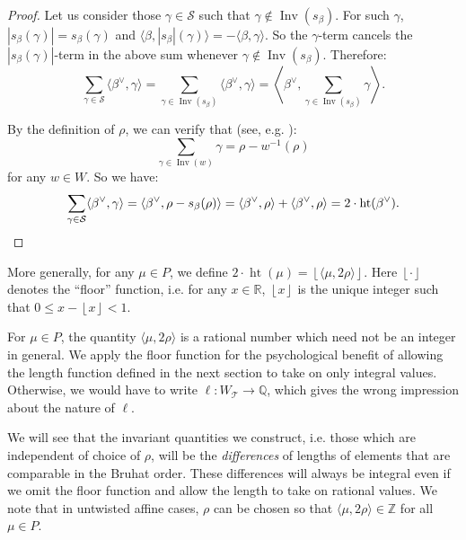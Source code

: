 \documentclass[ALCO,ThmDefs,Unicode]{cedram}
\DeclareMathOperator{\height}{ht}
\DeclareMathOperator{\Inv}{Inv}
\newcommand{\betacheck}{\beta^\vee}
\newcommand{\floor}[1]{\left\lfloor #1 \right\rfloor}
\newcommand{\cS}{\mathcal{S}}
\newcommand{\cT}{\mathcal{T}}
\newcommand{\QQ}{\mathbb{Q}}
\newcommand{\RR}{\mathbb{R}}
\newcommand{\ZZ}{\mathbb{Z}}
\newcommand{\WTits}{W_{\TitsCone}}
\newcommand{\TitsCone}{\cT}
\begin{document}
\begin{proof}
Let us consider those $\gamma \in \cS$ such that $\gamma \notin \Inv(s_\beta)$. For such $\gamma$, $|s_\beta(\gamma)| = s_\beta(\gamma)$ and $\langle \beta, |s_\beta|(\gamma)\rangle = - \langle \beta, \gamma \rangle$. So the $\gamma$-term cancels the $|s_\beta(\gamma)|$-term in the above sum whenever $\gamma \notin \Inv(s_\beta)$. Therefore:
\[
\sum_{\gamma \in \cS} \langle \betacheck, \gamma \rangle = \sum_{\gamma \in \Inv(s_\beta)} \langle \betacheck, \gamma \rangle = \left\langle \betacheck, \sum_{\gamma \in \Inv(s_\beta)} \gamma \right\rangle.
\]

By the definition of $\rho$, we can verify that (see, e.g. \cite[Exercise~3.12]{K}):
\begin{equation}
\label{E:rho-wrho}
\sum_{\gamma \in \Inv(w)} \gamma = \rho - w^{-1}(\rho)
\end{equation}
for any $w\in W$. So we have:
\[
\sum_{\gamma \in \cS} \langle \betacheck, \gamma \rangle = \langle \betacheck, \rho - s_\beta(\rho) \rangle = \langle \betacheck, \rho \rangle + \langle \betacheck, \rho \rangle = 2 \cdot \height(\betacheck). \qedhere
\]
\end{proof}

More generally, for any $\mu\in P$, we define $2\cdot \height(\mu)=\floor{\langle \mu,2\rho\rangle}$. Here $\floor{\cdot}$ denotes the ``floor'' function, i.e. for any $x \in \RR$, $\floor{x}$ is the unique integer such that $0 \leq x - \floor{x} < 1$.

\begin{rema}
For $\mu\in P$, the quantity $\langle \mu,2\rho \rangle$ is a rational number which need not be an integer in general. We apply the floor function for the psychological benefit of allowing the length function defined in the next section to take on only integral values. Otherwise, we would have to write $\ell: \WTits \rightarrow \QQ$, which gives the wrong impression about the nature of $\ell$.

We will see that the invariant quantities we construct, i.e. those which are independent of choice of $\rho$, will be the \emph{differences} of lengths of elements that are comparable in the Bruhat order. These differences will always be integral even if we omit the floor function and allow the length to take on rational values. We note that in untwisted affine cases, $\rho$ can be chosen so that $\langle \mu, 2\rho\rangle \in \ZZ$ for all $\mu \in P$.
\end{rema}
\end{document}
